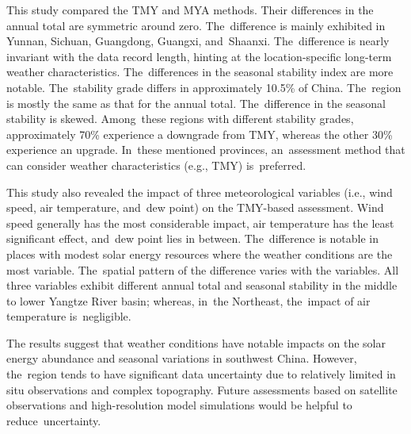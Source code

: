 \documentclass[atmosphere,article,accept,pdftex,moreauthors]{Definitions/mdpi}
\begin{document}
This study compared the TMY and MYA methods. Their differences in the annual total are symmetric around zero. The~difference is mainly exhibited in Yunnan, Sichuan, Guangdong, Guangxi, and~Shaanxi. The~difference is nearly invariant with the data record length, hinting at the location-specific long-term weather characteristics. The~differences in the seasonal stability index are more notable. The~stability grade differs in approximately 10.5\% of China. The~region is mostly the same as that for the annual total. The~difference in the seasonal stability is skewed. Among~these regions with different stability grades, approximately 70\% experience a downgrade from TMY, whereas the other 30\% experience an upgrade. In~these mentioned provinces, an~assessment method that can consider weather characteristics (e.g., TMY) is~preferred.

This study also revealed the impact of three meteorological variables (i.e., wind speed, air temperature, and~dew point) on the TMY-based assessment. Wind speed generally has the most considerable impact, air temperature has the least significant effect, and~dew point lies in between. The~difference is notable in places with modest solar energy resources where the weather conditions are the most variable. The~spatial pattern of the difference varies with the variables. All three variables exhibit different annual total and seasonal stability in the middle to lower Yangtze River basin; whereas, in~the Northeast, the~impact of air temperature is~negligible.

The results suggest that weather conditions have notable impacts on the solar energy abundance and seasonal variations in southwest China. However, the~region tends to have significant data uncertainty due to relatively limited in situ observations and complex topography. Future assessments based on satellite observations and high-resolution model simulations would be helpful to reduce~uncertainty.

\vspace{6pt}


\end{document}
